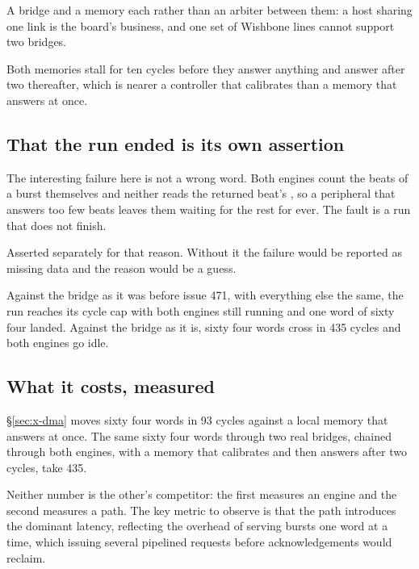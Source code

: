 A bridge and a memory each rather than an arbiter between them: a
host sharing one link is the board's business, and one set of
Wishbone lines cannot support two bridges.

Both memories stall for ten cycles before they answer anything and
answer after two thereafter, which is nearer a controller that
calibrates than a memory that answers at once.

\subsection{That the run ended is its own assertion}

The interesting failure here is not a wrong word. Both engines count
the beats of a burst themselves and neither reads the returned beat's
, so a peripheral that answers too few beats leaves them
waiting for the rest for ever. The fault is a run that does not
finish.

Asserted separately for that reason. Without it the failure would be
reported as missing data and the reason would be a guess.

Against the bridge as it was before issue 471, with everything else
the same, the run reaches its cycle cap with both engines still
running and one word of sixty four landed. Against the bridge as it
is, sixty four words cross in 435 cycles and both engines go idle.

\subsection{What it costs, measured}

\S\ref{sec:x-dma} moves sixty four words in 93 cycles against a local
memory that answers at once. The same sixty four words through two
real bridges, chained through both engines, with a memory that
calibrates and then answers after two cycles, take 435.

Neither number is the other's competitor: the first measures an
engine and the second measures a path. The key metric to observe is
that the path introduces the dominant latency, reflecting the overhead
of serving bursts one word at a time, which issuing several pipelined
requests before acknowledgements would reclaim.


